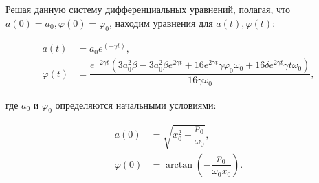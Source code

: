 \documentclass[11pt]{article}
\begin{document}
Решая данную систему дифференциальных уравнений, полагая, что
\(a(0) = a_0, \varphi(0) = \varphi_0\), находим уравнения для
\(a(t), \varphi(t)\):

\begin{equation}
\label{36}
\begin{aligned}
a(t) &= a_0 e^{(-\gamma t)},  \\
\varphi(t) &= \dfrac{ e^{-2 \gamma t} (3 a_0^2 \beta - 3 a_0^2 \beta e^{2 \gamma t} + 
  16 e^{2 \gamma t} \gamma \varphi_0 \omega_0 + 16 \delta e^{2 \gamma t} \gamma t \omega_0) }{ 16 \gamma \omega_0 },
\end{aligned}
\end{equation}

где \(a_0\) и \(\varphi_0\) определяются начальными условиями:

\begin{equation}
\label{37}
\begin{aligned}
a(0) &= \sqrt{x_0^2 + \dfrac{p_0}{\omega_0}},  \\
\varphi(0) &= \arctan(- \dfrac{p_0}{\omega_0 x_0}).
\end{aligned}
\end{equation}
\end{document}
